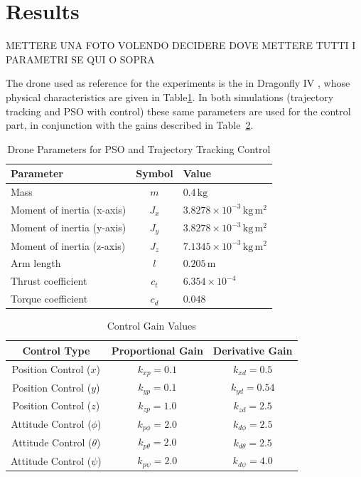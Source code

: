 \newpage
\section{Results}
METTERE UNA FOTO VOLENDO
DECIDERE DOVE METTERE TUTTI I PARAMETRI SE QUI O SOPRA

The drone used as reference for the experiments is 
the in Dragonfly IV \cite{drone}, whose physical characteristics are 
given in Table\ref{tab:drone_parameters}.
In both simulations (trajectory tracking and PSO with
control) these same parameters are used for the control
part, in conjunction with the gains 
described in Table~\ref{tab:control_gains}.
\begin{table}[h!]
\centering
\caption{Drone Parameters for PSO and Trajectory Tracking Control}
\begin{tabular}{|l|c|l|}
\hline
\textbf{Parameter}           & \textbf{Symbol}  & \textbf{Value} \\ \hline
Mass                        & \(m\)           & \(0.4 \, \text{kg}\) \\ \hline
Moment of inertia (x-axis)  & \(J_x\)         & \(3.8278 \times 10^{-3} \, \text{kg}\,\text{m}^2\) \\ \hline
Moment of inertia (y-axis)  & \(J_y\)         & \(3.8278 \times 10^{-3} \, \text{kg}\,\text{m}^2\) \\ \hline
Moment of inertia (z-axis)  & \(J_z\)         & \(7.1345 \times 10^{-3} \, \text{kg}\,\text{m}^2\) \\ \hline
Arm length                  & \(l\)           & \(0.205 \, \text{m}\) \\ \hline
Thrust coefficient          & \(c_t\)         & \(6.354 \times 10^{-4}\) \\ \hline
Torque coefficient          & \(c_d\)         & \(0.048\) \\ \hline
\end{tabular}
\label{tab:drone_parameters}
\end{table}
\begin{table}[h!]
\centering
\caption{Control Gain Values}
\label{tab:control_gains}
\begin{tabular}{|c|c|c|}
\hline
\textbf{Control Type} & \textbf{Proportional Gain} & \textbf{Derivative Gain} \\ \hline
Position Control (\(x\)) & \(k_{xp} = 0.1\)         & \(k_{xd} = 0.5\)         \\ \hline
Position Control (\(y\)) & \(k_{yp} = 0.1\)         & \(k_{yd} = 0.54\)        \\ \hline
Position Control (\(z\)) & \(k_{zp} = 1.0\)         & \(k_{zd} = 2.5\)         \\ \hline
Attitude Control (\(\phi\)) & \(k_{p\phi} = 2.0\)     & \(k_{d\phi} = 2.5\)      \\ \hline
Attitude Control (\(\theta\)) & \(k_{p\theta} = 2.0\)  & \(k_{d\theta} = 2.5\)    \\ \hline
Attitude Control (\(\psi\)) & \(k_{p\psi} = 2.0\)     & \(k_{d\psi} = 4.0\)      \\ \hline
\end{tabular}
\end{table}
